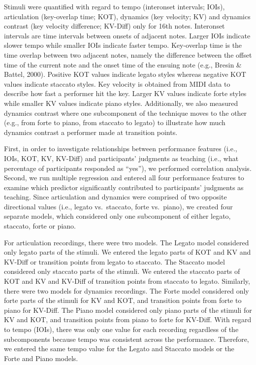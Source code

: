 \documentclass[
  man,floatsintext]{apa6}
\begin{document}
Stimuli were quantified with regard to tempo (interonset intervals; IOIs), articulation (key-overlap time; KOT), dynamics (key velocity; KV) and dynamics contrast (key velocity difference; KV-Diff) only for 16th notes. Interonset intervals are time intervals between onsets of adjacent notes. Larger IOIs indicate slower tempo while smaller IOIs indicate faster tempo. Key-overlap time is the time overlap between two adjacent notes, namely the difference between the offset time of the current note and the onset time of the ensuing note (e.g., Bresin \& Battel, 2000). Positive KOT values indicate legato styles whereas negative KOT values indicate staccato styles. Key velocity is obtained from MIDI data to describe how fast a performer hit the key. Larger KV values indicate forte styles while smaller KV values indicate piano styles. Additionally, we also measured dynamics contrast where one subcomponent of the technique moves to the other (e.g., from forte to piano, from staccato to legato) to illustrate how much dynamics contrast a performer made at transition points.

First, in order to investigate relationships between performance features (i.e., IOIs, KOT, KV, KV-Diff) and participants' judgments as teaching (i.e., what percentage of participants responded as ``yes''), we performed correlation analysis. Second, we run multiple regression and entered all four performance features to examine which predictor significantly contributed to participants' judgments as teaching. Since articulation and dynamics were comprised of two opposite directional values (i.e., legato vs.~staccato, forte vs.~piano), we created four separate models, which considered only one subcomponent of either legato, staccato, forte or piano.

For articulation recordings, there were two models. The Legato model considered only legato parts of the stimuli. We entered the legato parts of KOT and KV and KV-Diff or transition points from legato to staccato. The Staccato model considered only staccato parts of the stimuli. We entered the staccato parts of KOT and KV and KV-Diff of transition points from staccato to legato. Similarly, there were two models for dynamics recordings. The Forte model considered only forte parts of the stimuli for KV and KOT, and transition points from forte to piano for KV-Diff. The Piano model considered only piano parts of the stimuli for KV and KOT, and transition points from piano to forte for KV-Diff. With regard to tempo (IOIs), there was only one value for each recording regardless of the subcomponents because tempo was consistent across the performance. Therefore, we entered the same tempo value for the Legato and Staccato models or the Forte and Piano models.
\end{document}
